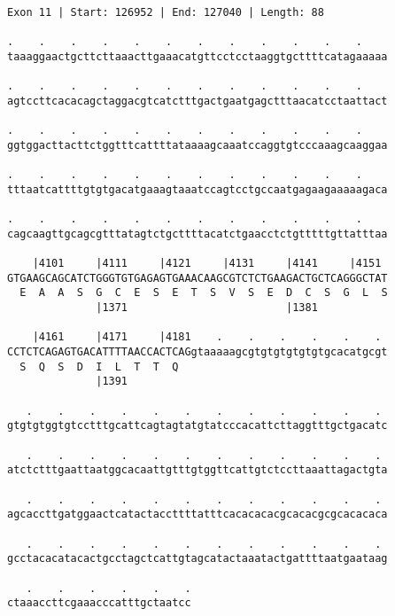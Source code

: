 \documentclass{article}
\begin{document}
\begin{Verbatim}
Exon 11 | Start: 126952 | End: 127040 | Length: 88
 
.    .    .    .    .    .    .    .    .    .    .    .    
taaaggaactgcttcttaaacttgaaacatgttcctcctaaggtgcttttcatagaaaaa
  
.    .    .    .    .    .    .    .    .    .    .    .    
agtccttcacacagctaggacgtcatctttgactgaatgagctttaacatcctaattact
  
.    .    .    .    .    .    .    .    .    .    .    .    
ggtggacttacttctggtttcattttataaaagcaaatccaggtgtcccaaagcaaggaa
  
.    .    .    .    .    .    .    .    .    .    .    .    
tttaatcattttgtgtgacatgaaagtaaatccagtcctgccaatgagaagaaaaagaca
  
.    .    .    .    .    .    .    .    .    .    .    .    
cagcaagttgcagcgtttatagtctgcttttacatctgaacctctgtttttgttatttaa
  
    |4101     |4111     |4121     |4131     |4141     |4151 
GTGAAGCAGCATCTGGGTGTGAGAGTGAAACAAGCGTCTCTGAAGACTGCTCAGGGCTAT
  E  A  A  S  G  C  E  S  E  T  S  V  S  E  D  C  S  G  L  S
              |1371                         |1381           
  
    |4161     |4171     |4181    .    .    .    .    .    . 
CCTCTCAGAGTGACATTTTAACCACTCAGgtaaaaagcgtgtgtgtgtgtgcacatgcgt
  S  Q  S  D  I  L  T  T  Q                                 
              |1391                                         
  
   .    .    .    .    .    .    .    .    .    .    .    . 
gtgtgtggtgtcctttgcattcagtagtatgtatcccacattcttaggtttgctgacatc
  
   .    .    .    .    .    .    .    .    .    .    .    . 
atctctttgaattaatggcacaattgtttgtggttcattgtctccttaaattagactgta
  
   .    .    .    .    .    .    .    .    .    .    .    . 
agcaccttgatggaactcatactaccttttatttcacacacacgcacacgcgcacacaca
  
   .    .    .    .    .    .    .    .    .    .    .    . 
gcctacacatacactgcctagctcattgtagcatactaaatactgattttaatgaataag
  
   .    .    .    .    .    .
ctaaaccttcgaaacccatttgctaatcc
\end{Verbatim}
\newpage
\end{document}
